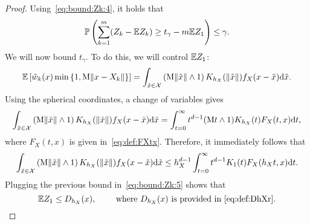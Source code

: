 \begin{proof}
  Using~\eqref{eq:bound:Zk:4}, it holds that
  \begin{equation*}
    \mathbb{P}\left({ \sum_{k=1}^{m} (Z_k-\mathbb{E} Z_k) \ge t_{\gamma} - m \mathbb{E} Z_1}\right)
    \le \gamma.
  \end{equation*}
  We will now bound $t_{\gamma}$. To do this, we will control $\mathbb{E} Z_1$:
  \begin{equation}\label{eq:bound:Zk:5}
    \mathbb{E}\left[{\tilde{w}_{k}(x) \min\left\{{1, \mathrm{M}\|{x-X_k}\|}\right\}}\right]
    = \int_{\tilde{x} \in \mathcal{X}} \left({\mathrm{M} \|{\tilde{x}}\| \wedge 1}\right) K_{h_X}(\|{\tilde{x}}\|) f_{X}(x-\tilde{x}) \mathrm{d} \tilde{x}.
  \end{equation}
  Using the spherical coordinates, a change of variables gives  
  \begin{equation*}
    \int_{\tilde{x} \in \mathcal{X}} \left({\mathrm{M} \|{\tilde{x}}\| \wedge 1}\right) K_{h_X}(\|{\tilde{x}}\|) f_{X}(x-\tilde{x}) \mathrm{d} \tilde{x}
    = \int_{t=0}^{\infty} t^{d-1} (\mathrm{M} t \wedge 1) K_{h_X}(t) F_{X}(t,x) \mathrm{d} t,
  \end{equation*}
  where $F_{X}(t,x)$ is given in~\eqref{eq:def:FXtx}.
  Therefore, it immediately follows that
  \begin{equation*}
    \int_{\tilde{x} \in \mathcal{X}} \left({\mathrm{M} \|{\tilde{x}}\| \wedge 1}\right) K_{h_X}(\|{\tilde{x}}\|) f_{X}(x-\tilde{x}) \mathrm{d} \tilde{x}
    \le h_X^{d-1} \int_{t=0}^{\infty} t^{d-1} K_{1}(t) F_{X}(h_X t,x) \mathrm{d} t.
  \end{equation*}
  Plugging the previous bound in~\eqref{eq:bound:Zk:5} shows that
  \begin{equation*}
    \mathbb{E} Z_1
    \le D_{h_X}(x),
    \qquad
    \text{ where $D_{h_X}(x)$ is provided in~\eqref{eq:def:DhXr}.}
  \end{equation*}
\end{proof}
